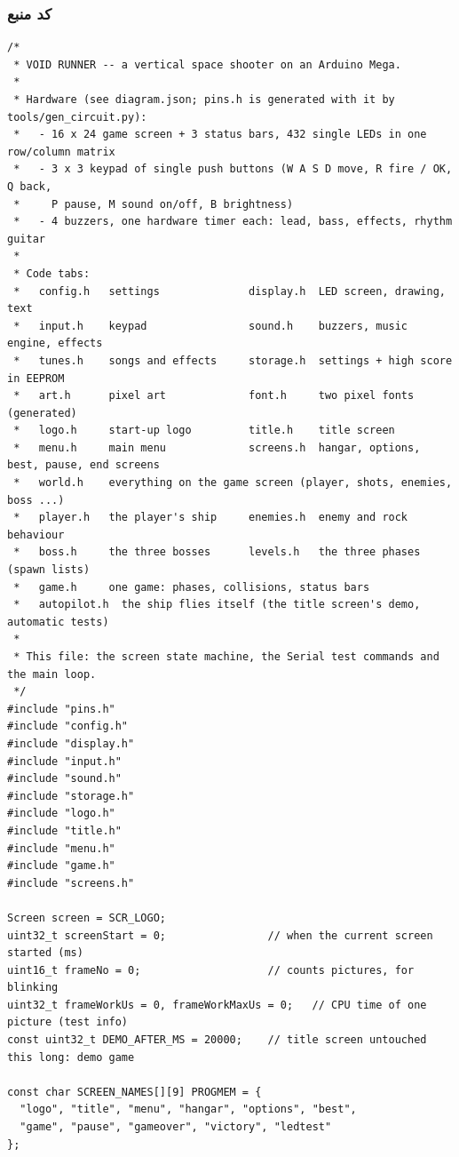 \documentclass[11pt,a4paper]{article}
\begin{document}
\subsubsection*{کد منبع}
\begin{latin}
\begin{lstlisting}[language=Arduino]
/*
 * VOID RUNNER -- a vertical space shooter on an Arduino Mega.
 *
 * Hardware (see diagram.json; pins.h is generated with it by tools/gen_circuit.py):
 *   - 16 x 24 game screen + 3 status bars, 432 single LEDs in one row/column matrix
 *   - 3 x 3 keypad of single push buttons (W A S D move, R fire / OK, Q back,
 *     P pause, M sound on/off, B brightness)
 *   - 4 buzzers, one hardware timer each: lead, bass, effects, rhythm guitar
 *
 * Code tabs:
 *   config.h   settings              display.h  LED screen, drawing, text
 *   input.h    keypad                sound.h    buzzers, music engine, effects
 *   tunes.h    songs and effects     storage.h  settings + high score in EEPROM
 *   art.h      pixel art             font.h     two pixel fonts (generated)
 *   logo.h     start-up logo         title.h    title screen
 *   menu.h     main menu             screens.h  hangar, options, best, pause, end screens
 *   world.h    everything on the game screen (player, shots, enemies, boss ...)
 *   player.h   the player's ship     enemies.h  enemy and rock behaviour
 *   boss.h     the three bosses      levels.h   the three phases (spawn lists)
 *   game.h     one game: phases, collisions, status bars
 *   autopilot.h  the ship flies itself (the title screen's demo, automatic tests)
 *
 * This file: the screen state machine, the Serial test commands and the main loop.
 */
#include "pins.h"
#include "config.h"
#include "display.h"
#include "input.h"
#include "sound.h"
#include "storage.h"
#include "logo.h"
#include "title.h"
#include "menu.h"
#include "game.h"
#include "screens.h"

Screen screen = SCR_LOGO;
uint32_t screenStart = 0;                // when the current screen started (ms)
uint16_t frameNo = 0;                    // counts pictures, for blinking
uint32_t frameWorkUs = 0, frameWorkMaxUs = 0;   // CPU time of one picture (test info)
const uint32_t DEMO_AFTER_MS = 20000;    // title screen untouched this long: demo game

const char SCREEN_NAMES[][9] PROGMEM = {
  "logo", "title", "menu", "hangar", "options", "best",
  "game", "pause", "gameover", "victory", "ledtest"
};


\end{lstlisting}
\end{latin}
\end{document}
